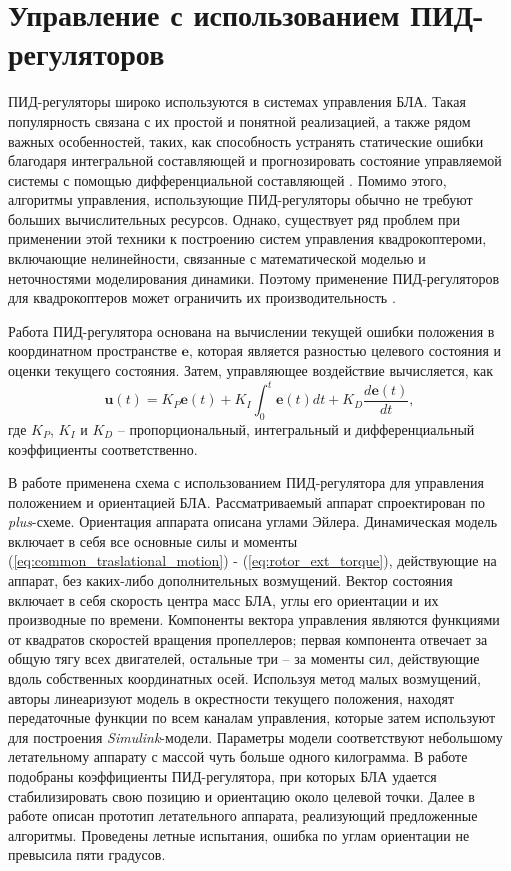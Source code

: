 \section{Управление с использованием ПИД-регуляторов}

ПИД-регуляторы широко используются в системах управления БЛА.
Такая популярность связана с их простой и понятной реализацией, а также рядом важных особенностей, таких, как способность устранять статические ошибки благодаря интегральной составляющей и прогнозировать состояние управляемой системы с помощью дифференциальной составляющей  \cite{Astrom01}.
Помимо этого, алгоритмы управления, использующие ПИД-регуляторы обычно не требуют больших вычислительных ресурсов.
Однако, существует ряд проблем при применении этой техники к построению систем управления квадрокоптероми, включающие нелинейности, связанные с математической моделью и неточностями моделирования динамики.
Поэтому применение ПИД-регуляторов для квадрокоптеров может ограничить их производительность \cite{Zulu01}.

Работа ПИД-регулятора основана на вычислении текущей ошибки положения в координатном пространстве $\bm{e}$, которая является разностью целевого состояния и оценки текущего состояния. Затем, управляющее воздействие вычисляется, как
\begin{equation} \label{eq:pid_common}
\bm{u}(t) = K_P \bm{e}(t) + K_I\int_0^t \bm{e}(t) dt + K_D \frac{d\bm{e}(t)}{dt},
\end{equation}
где $K_P$, $K_I$ и $K_D$ -- пропорциональный, интегральный и дифференциальный коэффициенты соответственно.

В работе \cite{Li01} применена схема с использованием ПИД-регулятора для управления положением и ориентацией БЛА.
Рассматриваемый аппарат спроектирован по \textit{plus}-схеме.
Ориентация аппарата описана углами Эйлера.
Динамическая модель включает в себя все основные силы и моменты (\ref{eq:common_traslational_motion}) - (\ref{eq:rotor_ext_torque}), действующие на аппарат, без каких-либо дополнительных возмущений.
Вектор состояния включает в себя скорость центра масс БЛА, углы его ориентации и их производные по времени.
Компоненты вектора управления являются функциями от квадратов скоростей вращения пропеллеров; первая компонента отвечает за общую тягу всех двигателей, остальные три -- за моменты сил, действующие вдоль собственных координатных осей.
Используя метод малых возмущений, авторы линеаризуют модель в окрестности текущего положения, находят передаточные функции по всем каналам управления, которые затем используют для построения \textit{Simulink}-модели.
Параметры модели соответствуют небольшому летательному аппарату с массой чуть больше одного килограмма.
В работе подобраны коэффициенты ПИД-регулятора, при которых БЛА удается стабилизировать свою позицию и ориентацию около целевой точки.
Далее в работе описан прототип летательного аппарата, реализующий предложенные алгоритмы.
Проведены летные испытания, ошибка по углам ориентации не превысила пяти градусов.

